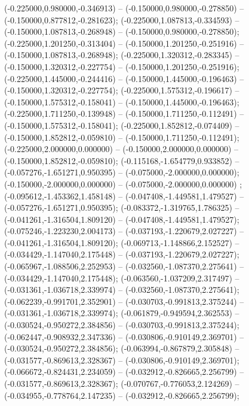  (-0.225000,0.980000,-0.346913) -- (-0.150000,0.980000,-0.278850) -- (-0.150000,0.877812,-0.281623);
 (-0.225000,1.087813,-0.334593) -- (-0.150000,1.087813,-0.268948) -- (-0.150000,0.980000,-0.278850);
 (-0.225000,1.201250,-0.313404) -- (-0.150000,1.201250,-0.251916) -- (-0.150000,1.087813,-0.268948);
 (-0.225000,1.320312,-0.283345) -- (-0.150000,1.320312,-0.227754) -- (-0.150000,1.201250,-0.251916);
 (-0.225000,1.445000,-0.244416) -- (-0.150000,1.445000,-0.196463) -- (-0.150000,1.320312,-0.227754);
 (-0.225000,1.575312,-0.196617) -- (-0.150000,1.575312,-0.158041) -- (-0.150000,1.445000,-0.196463);
 (-0.225000,1.711250,-0.139948) -- (-0.150000,1.711250,-0.112491) -- (-0.150000,1.575312,-0.158041);
 (-0.225000,1.852812,-0.074409) -- (-0.150000,1.852812,-0.059810) -- (-0.150000,1.711250,-0.112491);
 (-0.225000,2.000000,0.000000) -- (-0.150000,2.000000,0.000000) -- (-0.150000,1.852812,-0.059810);
 (-0.115168,-1.654779,0.933852) -- (-0.057276,-1.651271,0.950395) -- (-0.075000,-2.000000,0.000000);
 (-0.150000,-2.000000,0.000000) -- (-0.075000,-2.000000,0.000000) ;
 (-0.095612,-1.453362,1.458148) -- (-0.047408,-1.449581,1.479527) -- (-0.057276,-1.651271,0.950395);
 (-0.083372,-1.319765,1.786325) -- (-0.041261,-1.316504,1.809120) -- (-0.047408,-1.449581,1.479527);
 (-0.075246,-1.223230,2.004173) -- (-0.037193,-1.220679,2.027227) -- (-0.041261,-1.316504,1.809120);
 (-0.069713,-1.148866,2.152527) -- (-0.034429,-1.147040,2.175448) -- (-0.037193,-1.220679,2.027227);
 (-0.065967,-1.088506,2.252953) -- (-0.032560,-1.087370,2.275641) -- (-0.034429,-1.147040,2.175448);
 (-0.063560,-1.037209,2.317497) -- (-0.031361,-1.036718,2.339974) -- (-0.032560,-1.087370,2.275641);
 (-0.062239,-0.991701,2.352901) -- (-0.030703,-0.991813,2.375244) -- (-0.031361,-1.036718,2.339974);
 (-0.061879,-0.949594,2.362553) -- (-0.030524,-0.950272,2.384856) -- (-0.030703,-0.991813,2.375244);
 (-0.062447,-0.908932,2.347336) -- (-0.030806,-0.910149,2.369701) -- (-0.030524,-0.950272,2.384856);
 (-0.063994,-0.867879,2.305848) -- (-0.031577,-0.869613,2.328367) -- (-0.030806,-0.910149,2.369701);
 (-0.066672,-0.824431,2.234059) -- (-0.032912,-0.826665,2.256799) -- (-0.031577,-0.869613,2.328367);
 (-0.070767,-0.776053,2.124269) -- (-0.034955,-0.778764,2.147235) -- (-0.032912,-0.826665,2.256799);
